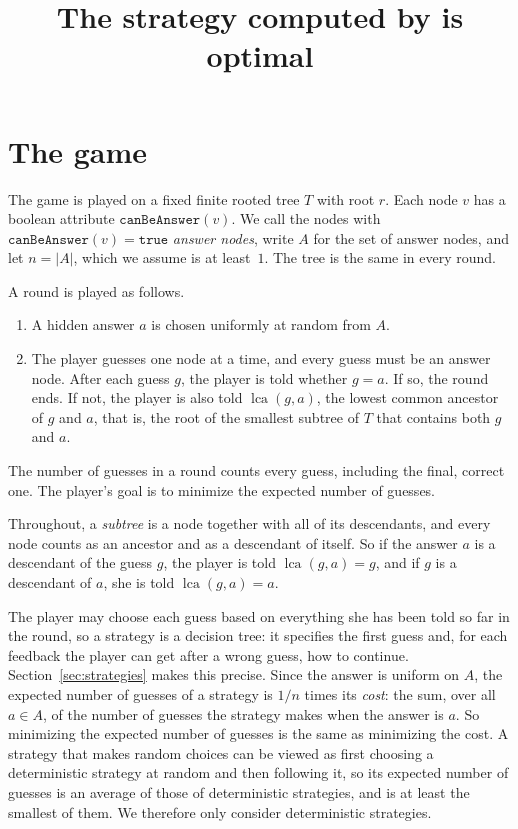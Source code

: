 \documentclass[11pt]{article}
\title{The strategy computed by \code{compute\_optimal\_guesses.py} is optimal}
\author{}
\date{}
\newcommand{\lca}{\operatorname{lca}}
\newcommand{\code}[1]{\texttt{#1}}
\begin{document}
\maketitle

\section{The game}
\label{sec:game}

The game is played on a fixed finite rooted tree $T$ with root $r$. Each node $v$
has a boolean attribute $\code{canBeAnswer}(v)$. We call the nodes with
$\code{canBeAnswer}(v) = \code{true}$ \emph{answer nodes}, write $A$ for the set
of answer nodes, and let $n = |A|$, which we assume is at least~$1$. The tree is
the same in every round.

A round is played as follows.
\begin{enumerate}
  \item A hidden answer $a$ is chosen uniformly at random from $A$.
  \item The player guesses one node at a time, and every guess must be an answer
    node. After each guess $g$, the player is told whether $g = a$. If so, the
    round ends. If not, the player is also told $\lca(g, a)$, the lowest common
    ancestor of $g$ and $a$, that is, the root of the smallest subtree of $T$
    that contains both $g$ and $a$.
\end{enumerate}
The number of guesses in a round counts every guess, including the final, correct
one. The player's goal is to minimize the expected number of guesses.

Throughout, a \emph{subtree} is a node together with all of its descendants, and
every node counts as an ancestor and as a descendant of itself. So if the answer
$a$ is a descendant of the guess $g$, the player is told $\lca(g, a) = g$, and if
$g$ is a descendant of $a$, she is told $\lca(g, a) = a$.

The player may choose each guess based on everything she has been told so far in
the round, so a strategy is a decision tree: it specifies the first guess and, for
each feedback the player can get after a wrong guess, how to continue.
Section~\ref{sec:strategies} makes this precise. Since the answer is uniform on
$A$, the expected number of guesses of a strategy is $1/n$ times its
\emph{cost}: the sum, over all $a \in A$, of the number of guesses the strategy
makes when the answer is $a$. So minimizing the expected number of guesses is the
same as minimizing the cost. A strategy that makes random choices can be viewed as
first choosing a deterministic strategy at random and then following it, so its
expected number of guesses is an average of those of deterministic strategies,
and is at least the smallest of them. We therefore only consider deterministic
strategies.
\end{document}
